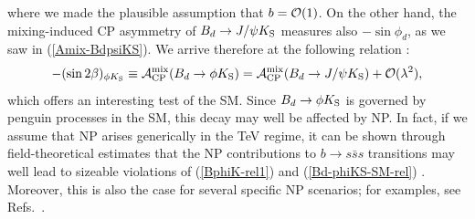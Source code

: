 \documentclass[12pt]{article}
\begin{document}
where we made the plausible assumption that $b={\cal O}(1)$. On the other 
hand, the mixing-induced CP asymmetry of 
$B_d\to J/\psi K_{\rm S}$ measures also $-\sin\phi_d$, as we saw in
(\ref{Amix-BdpsiKS}). We arrive therefore at the following 
relation \cite{RF-EWP-rev,growo}:
\begin{equation}\label{Bd-phiKS-SM-rel}
-(\sin2\beta)_{\phi K_{\rm S}}\equiv
{\cal A}_{\rm CP}^{\rm mix}(B_d\to \phi K_{\rm S}) 
={\cal A}_{\rm CP}^{\rm mix}(B_d\to J/\psi K_{\rm S}) + 
{\cal O}(\lambda^2),
\end{equation}
which offers an interesting test of the SM. Since $B_d\to \phi K_{\rm S}$ is 
governed by penguin processes in the SM, this decay may well be affected by 
NP. In fact, if we assume that NP arises generically in the TeV regime, it can be 
shown through field-theoretical estimates that the NP contributions to  
$b\to s\bar s s$ transitions may well lead to sizeable violations of
(\ref{BphiK-rel1}) and (\ref{Bd-phiKS-SM-rel}) \cite{RF-Phys-Rep,FM-BphiK}. Moreover, 
this is also the case for several specific NP scenarios; for examples, see 
Refs.~\cite{CFMS,Ko,GHK,Z-prime-BpiK}.
\end{document}
